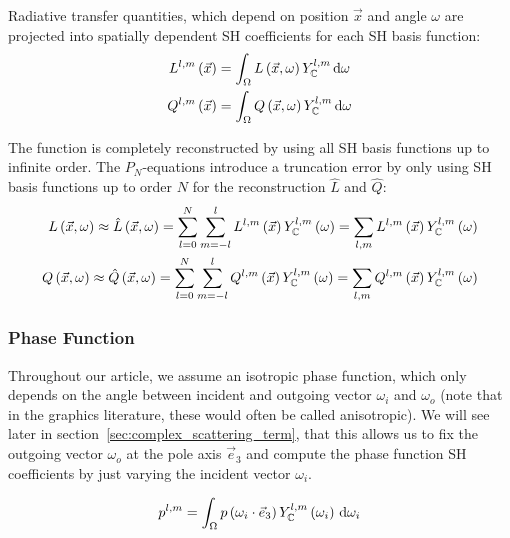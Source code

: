 \documentclass[10pt]{scrartcl}
\begin{document}
Radiative transfer quantities, which depend on position $\vec{x}$ and angle $\omega$ are projected into spatially dependent SH coefficients for each SH basis function:
\begin{align}
L^{l,m}\left(\vec{x}\right)
&=
\int_\Omega{L\left(\vec{x}, \omega\right)Y_{\mathbb{C}}^{l,m}\,\mathrm{d}\omega}\nonumber\\
Q^{l,m}\left(\vec{x}\right)
&=
\int_\Omega{Q\left(\vec{x}, \omega\right)Y_{\mathbb{C}}^{l,m}\,\mathrm{d}\omega}\nonumber
\end{align} 

The function is completely reconstructed by using all SH basis functions up to infinite order. The $P_N$-equations introduce a truncation error by only using SH basis functions up to order $N$ for the reconstruction $\hat{L}$ and $\hat{Q}$:
\begin{align}
\label{eq:sh_exp_L}
L\left(\vec{x}, \omega\right)
\approx
\hat{L}\left(\vec{x}, \omega\right) =
\sum_{l=0}^{N}
{
\sum_{m=-l}^{l}
{
L^{l,m}\left(\vec{x}\right)Y_{\mathbb{C}}^{l,m}\left(\omega\right)
}
}
=
\sum_{l,m}
{
L^{l,m}\left(\vec{x}\right)Y_{\mathbb{C}}^{l,m}\left(\omega\right)
}\nonumber\\
Q\left(\vec{x}, \omega\right)
\approx
\hat{Q}\left(\vec{x}, \omega\right) =
\sum_{l=0}^{N}
{
\sum_{m=-l}^{l}
{
Q^{l,m}\left(\vec{x}\right)Y_{\mathbb{C}}^{l,m}\left(\omega\right)
}
}
=
\sum_{l,m}
{
Q^{l,m}\left(\vec{x}\right)Y_{\mathbb{C}}^{l,m}\left(\omega\right)
}
\end{align}

\subsubsection{Phase Function}
\label{sec:complex_proj_phase}

Throughout our article, we assume an isotropic phase function, which only depends on the angle between incident and outgoing vector $\omega_i$ and $\omega_o$ (note that in the graphics literature, these would often be called anisotropic). We will see later in section~\ref{sec:complex_scattering_term}, that this allows us to fix the outgoing vector $\omega_o$ at the pole axis $\vec{e}_3$ and compute the phase function SH coefficients by just varying the incident vector $\omega_i$.

\begin{align*}
p^{l,m}
=
\int_\Omega
{
p\left(\omega_i\cdot\vec{e}_3\right)
Y_{\mathbb{C}}^{l,m}\left(\omega_i\right)
\,\mathrm{d}\omega_i
}
\nonumber
\end{align*}
\end{document}
